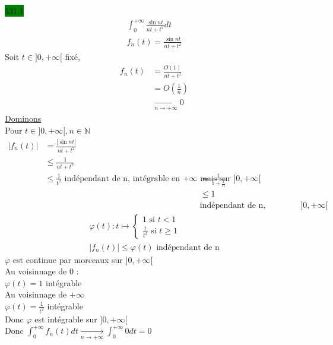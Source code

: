 \documentclass{article}
\begin{document}
\noindent \colorbox{green}{531.1}\\
\begin{eqnarray*}
    \int_{0}^{+\infty} \frac{\sin nt }{nt + t^{2}}dt\\
    f_{n}(t) = \frac{\sin nt}{nt + t^{2}}
\end{eqnarray*}
Soit \(t \in ]0, +\infty[\) fixé, 
\begin{align*}
  f_{n}(t) &= \frac{O(1)}{nt + t^{2}}\\
    &= O(\frac{1}{n})\\ 
    &\xrightarrow[n \to +\infty]{} 0
\end{align*}
\underline{Dominons}\\
Pour \(t \in ]0, +\infty[, n  \in \mathbb{N}\)
\begin{align*}
  |f_{n}(t)| &= \frac{|\sin nt|}{nt + t^{2}} \\
             &\leq \frac{1}{nt+t^{2}}\\
             &\leq \frac{1}{t^{2}} \text { indépendant de n, 
intégrable en \(+ \infty\) mais sur \(]0, +\infty[\)} &= \frac{1}{1+\frac{t}{n}} \\
             & &\leq 1 \\
             & &\text{indépendant de n, intégrable en 0, mais pas sur } ]0, +\infty[
\end{align*}
\begin{align*}
    \varphi(t) : t \mapsto \begin{cases} 
      1 \text{ si } t < 1 \\
      \frac{1}{t^{2}} \text{ si } t \geq 1
    \end{cases}\\
    |f_{n}(t)| \leq \varphi(t) \text{ indépendant de n}
\end{align*}
\(\varphi\) est continue par morceaux sur \(]0, +\infty[\)\\
Au voisinnage de 0 : \\
\(\varphi(t) = 1\) intégrable\\
Au voisinnage de \(+\infty\)\\
\(\varphi(t) = \frac{1}{t^{2}}\) intégrable\\
Donc \(\varphi\) est intégrable sur \(]0, +\infty[\)\\
Donc \(\int_{0}^{+\infty}f_{n}(t)dt \xrightarrow[n \to +\infty]{} \int_{0}^{+\infty}0 dt = 0\)\\
\end{document}
